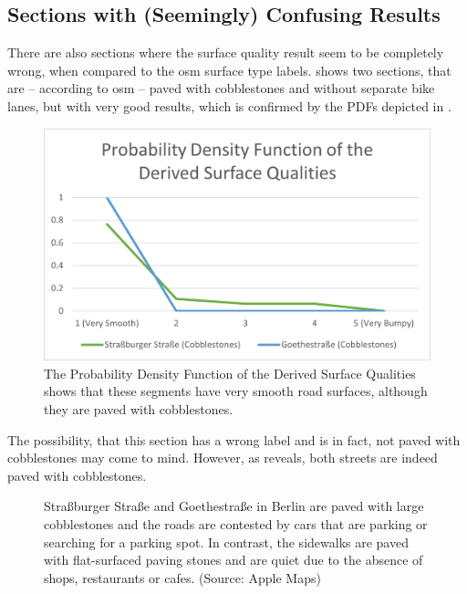 \subsection{Sections with (Seemingly) Confusing Results}
\label{subsec:sections_with_seemingly_confusing_results}
There are also sections where the surface quality result seem to be completely wrong, when compared to the \ac{osm} surface type labels.
 shows two sections, that are -- according to \ac{osm} -- paved with cobblestones and without separate bike lanes, but with very good results, which is confirmed by the PDFs depicted in .

\begin{figure}
    \centering
    \includegraphics[width=0.7\columnwidth]{fig/pdf_mismatched.png}
    \caption{%
        The Probability Density Function of the Derived Surface Qualities shows that these segments have very smooth road surfaces, although they are paved with cobblestones.
    }%
    \label{fig:mismatched}
\end{figure}

The possibility, that this section has a wrong label and is in fact, not paved with cobblestones may come to mind.
However, as  reveals, both streets are indeed paved with cobblestones.

\begin{figure}%
    \centering
    \hfill
    \caption{%
        Straßburger Straße and Goethestraße in Berlin are paved with large cobblestones and the roads are contested by cars that are parking or searching for a parking spot. In contrast, the sidewalks are paved with flat-surfaced paving stones and are quiet due to the absence of shops, restaurants or cafes. (Source: Apple Maps)
    }%
    \label{fig:sidewalk}
    \vspace{-.5em}
\end{figure}

